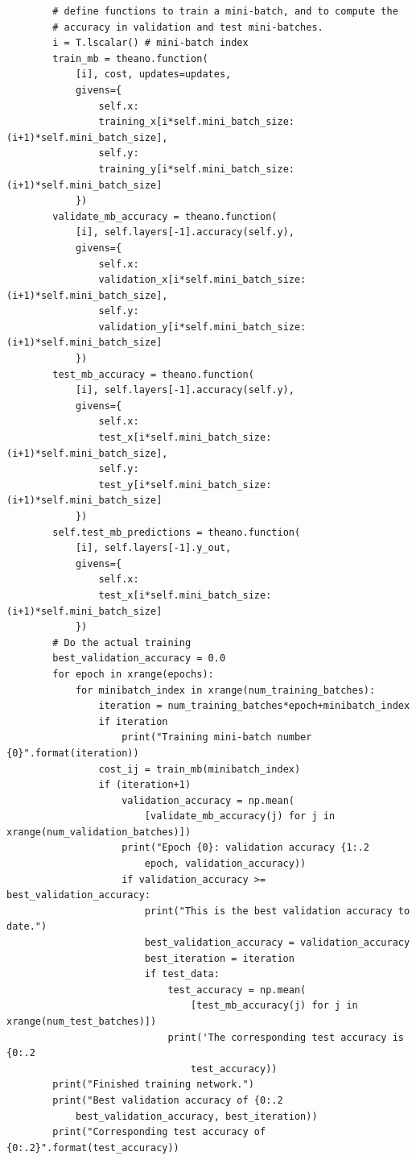 \documentclass[a4paper,twoside,10pt]{book}
\begin{document}
\begin{lstlisting}
        # define functions to train a mini-batch, and to compute the
        # accuracy in validation and test mini-batches.
        i = T.lscalar() # mini-batch index
        train_mb = theano.function(
            [i], cost, updates=updates,
            givens={
                self.x:
                training_x[i*self.mini_batch_size: (i+1)*self.mini_batch_size],
                self.y: 
                training_y[i*self.mini_batch_size: (i+1)*self.mini_batch_size]
            })
        validate_mb_accuracy = theano.function(
            [i], self.layers[-1].accuracy(self.y),
            givens={
                self.x: 
                validation_x[i*self.mini_batch_size: (i+1)*self.mini_batch_size],
                self.y: 
                validation_y[i*self.mini_batch_size: (i+1)*self.mini_batch_size]
            })
        test_mb_accuracy = theano.function(
            [i], self.layers[-1].accuracy(self.y),
            givens={
                self.x: 
                test_x[i*self.mini_batch_size: (i+1)*self.mini_batch_size],
                self.y: 
                test_y[i*self.mini_batch_size: (i+1)*self.mini_batch_size]
            })
        self.test_mb_predictions = theano.function(
            [i], self.layers[-1].y_out,
            givens={
                self.x: 
                test_x[i*self.mini_batch_size: (i+1)*self.mini_batch_size]
            })
        # Do the actual training
        best_validation_accuracy = 0.0
        for epoch in xrange(epochs):
            for minibatch_index in xrange(num_training_batches):
                iteration = num_training_batches*epoch+minibatch_index
                if iteration 
                    print("Training mini-batch number {0}".format(iteration))
                cost_ij = train_mb(minibatch_index)
                if (iteration+1) 
                    validation_accuracy = np.mean(
                        [validate_mb_accuracy(j) for j in xrange(num_validation_batches)])
                    print("Epoch {0}: validation accuracy {1:.2
                        epoch, validation_accuracy))
                    if validation_accuracy >= best_validation_accuracy:
                        print("This is the best validation accuracy to date.")
                        best_validation_accuracy = validation_accuracy
                        best_iteration = iteration
                        if test_data:
                            test_accuracy = np.mean(
                                [test_mb_accuracy(j) for j in xrange(num_test_batches)])
                            print('The corresponding test accuracy is {0:.2
                                test_accuracy))
        print("Finished training network.")
        print("Best validation accuracy of {0:.2
            best_validation_accuracy, best_iteration))
        print("Corresponding test accuracy of {0:.2}".format(test_accuracy))
\end{lstlisting}
\end{document}
